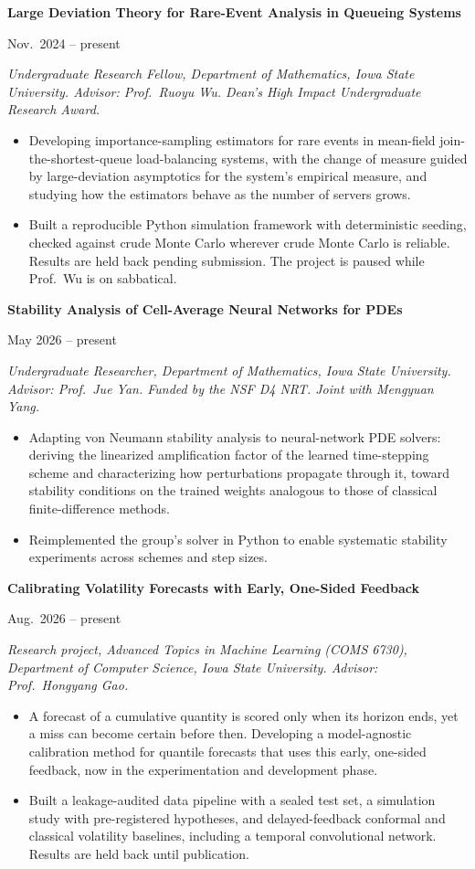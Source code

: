 \documentclass[11pt]{article}
\newcommand{\entry}[2]{%
  \noindent\begin{minipage}[t]{0.78\textwidth}\raggedright\textbf{#1}\end{minipage}%
  \hfill%
  \begin{minipage}[t]{0.22\textwidth}\raggedleft #2\end{minipage}\par\vspace{0.1em}}
\newcommand{\subentry}[1]{\noindent\textit{#1}\par\vspace{0.15em}}
\begin{document}
\vspace{0.35em}
\entry{Large Deviation Theory for Rare-Event Analysis in Queueing Systems}{Nov.\ 2024 -- present}
\subentry{Undergraduate Research Fellow, Department of Mathematics, Iowa State
University. Advisor: Prof.\ Ruoyu Wu. Dean's High Impact Undergraduate Research Award.}
\begin{itemize}
  \item Developing importance-sampling estimators for rare events in mean-field
    join-the-shortest-queue load-balancing systems, with the change of measure guided by
    large-deviation asymptotics for the system's empirical measure, and studying how the
    estimators behave as the number of servers grows.
  \item Built a reproducible Python simulation framework with deterministic seeding,
    checked against crude Monte Carlo wherever crude Monte Carlo is reliable. Results are
    held back pending submission. The project is paused while Prof.\ Wu is on sabbatical.
\end{itemize}

\vspace{0.35em}
\entry{Stability Analysis of Cell-Average Neural Networks for PDEs}{May 2026 -- present}
\subentry{Undergraduate Researcher, Department of Mathematics, Iowa State University.
Advisor: Prof.\ Jue Yan. Funded by the NSF D4 NRT. Joint with Mengyuan Yang.}
\begin{itemize}
  \item Adapting von Neumann stability analysis to neural-network PDE solvers: deriving
    the linearized amplification factor of the learned time-stepping scheme and
    characterizing how perturbations propagate through it, toward stability conditions
    on the trained weights analogous to those of classical finite-difference methods.
  \item Reimplemented the group's solver in Python to enable systematic stability
    experiments across schemes and step sizes.
\end{itemize}

\vspace{0.35em}
\entry{Calibrating Volatility Forecasts with Early, One-Sided Feedback}{Aug.\ 2026 -- present}
\subentry{Research project, Advanced Topics in Machine Learning (COMS 6730),
Department of Computer Science, Iowa State University. Advisor: Prof.\ Hongyang Gao.}
\begin{itemize}
  \item A forecast of a cumulative quantity is scored only when its horizon ends, yet a
    miss can become certain before then. Developing a model-agnostic calibration method
    for quantile forecasts that uses this early, one-sided feedback, now in the
    experimentation and development phase.
  \item Built a leakage-audited data pipeline with a sealed test set, a simulation study
    with pre-registered hypotheses, and delayed-feedback conformal and classical
    volatility baselines, including a temporal convolutional network. Results are held
    back until publication.
\end{itemize}
\end{document}
